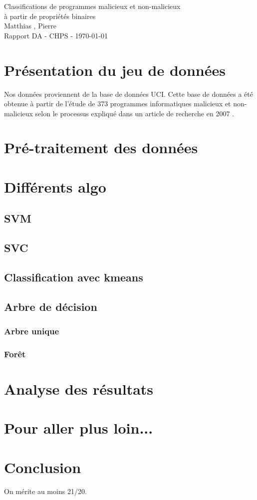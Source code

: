 \documentclass[11pt,a4paper]{article}
\begin{document}
\begin{center}

	{\LARGE\centering Classifications de programmes malicieux et non-malicieux\\ à partir de propriétés binaires}\\[1cm]

	{ Matthias , Pierre }\\[0.5cm]
	{Rapport DA - CHPS - \today}
\end{center}

\tableofcontents

\section{Présentation du jeu de données}
	Nos données proviennent de la base de données UCI\cite{UCI}.
	Cette base de données a été obtenue à partir de l'étude de 373 programmes informatiques malicieux et non-malicieux selon le processus expliqué dans un article de recherche en 2007 \cite{article}.

\section{Pré-traitement des données}

\section{Différents algo}
	\subsection{SVM}
	\subsection{SVC}
	\subsection{Classification avec kmeans}
	\subsection{Arbre de décision}
		\subsubsection{Arbre unique}
		\subsubsection{Forêt}

\section{Analyse des résultats}

\section{Pour aller plus loin...}

\section{Conclusion}
	On mérite au moins 21/20.




%
\end{document}
